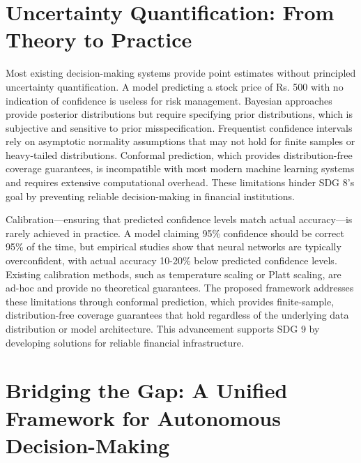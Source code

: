 \documentclass[12pt,a4paper,oneside]{report}
\theoremstyle{definition}
\theoremstyle{remark}
\begin{document}
\section{Uncertainty Quantification: From Theory to Practice}

Most existing decision-making systems provide point estimates without principled uncertainty quantification. A model predicting a stock price of Rs. 500 with no indication of confidence is useless for risk management. Bayesian approaches provide posterior distributions but require specifying prior distributions, which is subjective and sensitive to prior misspecification. Frequentist confidence intervals rely on asymptotic normality assumptions that may not hold for finite samples or heavy-tailed distributions. Conformal prediction, which provides distribution-free coverage guarantees, is incompatible with most modern machine learning systems and requires extensive computational overhead. These limitations hinder SDG 8's goal by preventing reliable decision-making in financial institutions.

Calibration—ensuring that predicted confidence levels match actual accuracy—is rarely achieved in practice. A model claiming 95\% confidence should be correct 95\% of the time, but empirical studies show that neural networks are typically overconfident, with actual accuracy 10-20\% below predicted confidence levels. Existing calibration methods, such as temperature scaling or Platt scaling, are ad-hoc and provide no theoretical guarantees. The proposed framework addresses these limitations through conformal prediction, which provides finite-sample, distribution-free coverage guarantees that hold regardless of the underlying data distribution or model architecture. This advancement supports SDG 9 by developing solutions for reliable financial infrastructure.

\section{Bridging the Gap: A Unified Framework for Autonomous Decision-Making}
\end{document}
